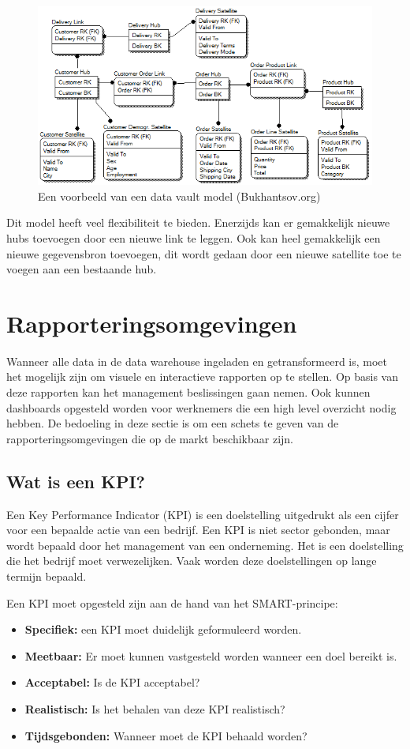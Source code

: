 \begin{figure}[h]
	\centering
	\includegraphics[scale=0.7]{../images/dvmodel.png}
	\caption{Een voorbeeld van een data vault model (Bukhantsov.org)}
	\label{fig:dvmod}
\end{figure}

Dit model heeft veel flexibiliteit te bieden. Enerzijds kan er gemakkelijk nieuwe hubs toevoegen door een nieuwe link te leggen. Ook kan heel gemakkelijk een nieuwe gegevensbron toevoegen, dit wordt gedaan door een nieuwe satellite toe te voegen aan een bestaande hub. 

\section{Rapporteringsomgevingen}
\label{sec:omgeving}
Wanneer alle data in de data warehouse ingeladen en getransformeerd is, moet het mogelijk zijn om visuele en interactieve rapporten op te stellen. Op basis van deze rapporten kan het management beslissingen gaan nemen. Ook kunnen dashboards opgesteld worden voor werknemers die een high level overzicht nodig hebben. De bedoeling in deze sectie is om een schets te geven van de rapporteringsomgevingen die op de markt beschikbaar zijn. 

\subsection{Wat is een KPI?}
Een Key Performance Indicator (KPI) is een doelstelling uitgedrukt als een cijfer voor een bepaalde actie van een bedrijf. Een KPI is niet sector gebonden, maar wordt bepaald door het management van een onderneming. Het is een doelstelling die het bedrijf moet verwezelijken. Vaak worden deze doelstellingen op lange termijn bepaald. 

Een KPI moet opgesteld zijn aan de hand van het SMART-principe:
\begin{itemize}
	\item \textbf{Specifiek: } een KPI moet duidelijk geformuleerd worden.
	\item \textbf{Meetbaar: } Er moet kunnen vastgesteld worden wanneer een doel bereikt is.
	\item \textbf{Acceptabel:} Is de KPI acceptabel?
	\item \textbf{Realistisch: } Is het behalen van deze KPI realistisch?
	\item \textbf{Tijdsgebonden: } Wanneer moet de KPI behaald worden?
\end{itemize} 

